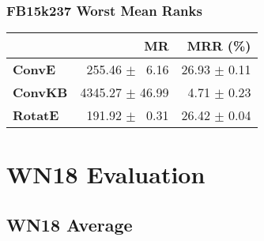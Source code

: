 \documentclass{article}
\begin{document}
\subsubsection{FB15k237 Worst Mean Ranks}
    \begin{center}
    \begin{tabular}{lrr}
\toprule
{} &               MR &      MRR (\%) \\
\midrule
\textbf{ConvE } &  $\phantom{5}$255.46 $\pm$ $\phantom{5}$6.16 &  26.93 $\pm$ 0.11 \\
\textbf{ConvKB} &  4345.27 $\pm$ 46.99 &  $\phantom{5}$4.71 $\pm$ 0.23 \\
\textbf{RotatE} &  $\phantom{5}$191.92 $\pm$ $\phantom{5}$0.31 &  26.42 $\pm$ 0.04 \\
\bottomrule
\end{tabular}

    \end{center}

\section{WN18 Evaluation}
\subsection{WN18 Average}
\end{document}
